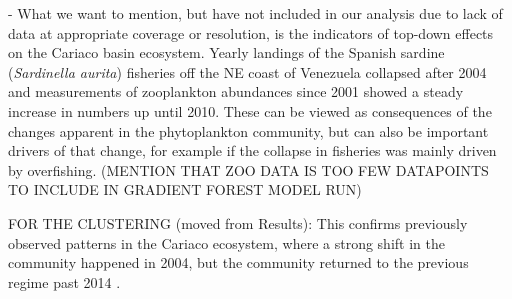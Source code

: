 




- What we want to mention, but have not included in our analysis due to lack of data at appropriate coverage or resolution, is the indicators of top-down effects on the Cariaco basin ecosystem. Yearly landings of the Spanish sardine (\textit{Sardinella aurita}) fisheries off the NE coast of Venezuela collapsed after 2004 and measurements of zooplankton abundances since 2001 showed a steady increase in numbers up until 2010. These can be viewed as consequences of the changes apparent in the phytoplankton community, but can also be important drivers of that change, for example if the collapse in fisheries was mainly driven by overfishing. (MENTION THAT ZOO DATA IS TOO FEW DATAPOINTS TO INCLUDE IN GRADIENT FOREST MODEL RUN)

FOR THE CLUSTERING (moved from Results): This confirms previously observed patterns in the Cariaco ecosystem, where a strong shift in the community happened in 2004, but the community returned to the previous regime past 2014 \cite{taylor_ecosystem_2012, muller-karger_scientific_2019}.